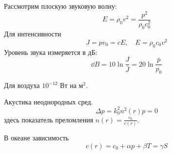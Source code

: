 Рассмотрим плоскую звуковую волну:
\begin{equation}
    E = \rho_0 v^2 = \frac{p^2}{\rho_0 c_0^2}
\end{equation}
Для интенсивности
\begin{equation}
    J = p v_0 = cE, \quad E = \rho_0 c_0 v^2
\end{equation}
Уровень звука измеряется в дБ:
\begin{equation}
    \dd{B} = 10 \ln \frac{J}{\bar{J}} = 
    20 \ln \frac{\bar{p}}{p_0}
\end{equation}

Для воздуха $10^{-12}$ Вт на м${}^2$.


Акустика неоднородных сред.
\begin{equation}
    \Delta p = k_0^2 n^2(r) p = 0 
\end{equation}
здесь показатель преломления $n(r)=\frac{c_0}{c(r)}$.

В океане зависимость 
\begin{equation}
    c(r) = c_0 +\alpha p +\beta T = \gamma S
\end{equation}
